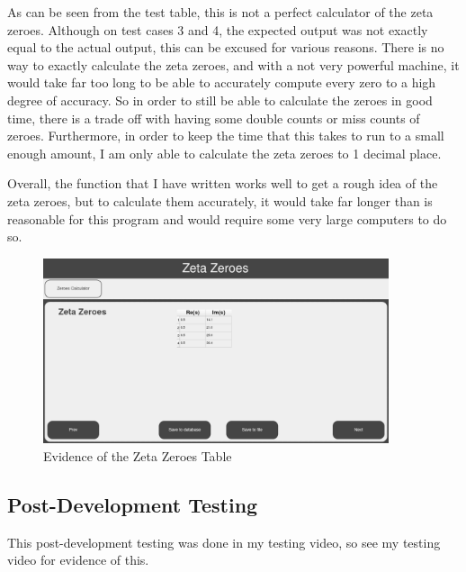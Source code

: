 \documentclass[12pt]{article}
\begin{document}
As can be seen from the test table, this is not a perfect calculator of the zeta zeroes. Although on test cases 3 and 4, the expected output was not exactly equal to the actual output, this can be excused for various reasons. There is no way to exactly calculate the zeta zeroes, and with a not very powerful machine, it would take far too long to be able to accurately compute every zero to a high degree of accuracy. So in order to still be able to calculate the zeroes in good time, there is a trade off with having some double counts or miss counts of zeroes. Furthermore, in order to keep the time that this takes to run to a small enough amount, I am only able to calculate the zeta zeroes to 1 decimal place.

Overall, the function that I have written works well to get a rough idea of the zeta zeroes, but to calculate them accurately, it would take far longer than is reasonable for this program and would require some very large computers to do so.

\begin{figure}[h]
    \centering
    \captionsetup{justification=centering}
    \includegraphics[width=4in]{zero-table-ev}
    \caption{Evidence of the Zeta Zeroes Table}
\end{figure}
\clearpage



\subsection{Post-Development Testing}

This post-development testing was done in my testing video, so see my testing video for evidence of this.
\end{document}
